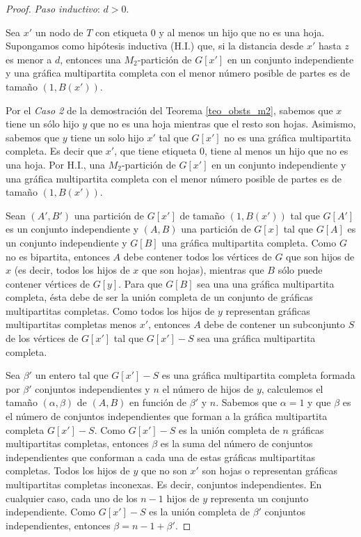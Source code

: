 \begin{proof}
\emph{Paso inductivo}: $d > 0$.

Sea $x'$ un nodo de $T$ con etiqueta 0 y al menos un hijo que no es una hoja. Supongamos como hipótesis inductiva (H.I.) que, si la distancia desde $x'$ hasta $z$ es menor a $d$, entonces una $M_2$-partición de $G[x']$ en un conjunto independiente y una gráfica multipartita completa con el menor número posible de partes es de tamaño $(1,B(x'))$.

Por el \emph{Caso 2} de la demostración del Teorema \ref{teo_obsts_m2}, sabemos que $x$ tiene un sólo hijo $y$ que no es una hoja mientras que el resto son hojas. Asimismo, sabemos que $y$ tiene un solo hijo $x'$ tal que $G[x']$ no es una gráfica multipartita completa. Es decir que $x'$, que tiene etiqueta 0, tiene al menos un hijo que no es una hoja. Por H.I., una $M_2$-partición de $G[x']$ en un conjunto independiente y una gráfica multipartita completa con el menor número posible de partes es de tamaño $(1,B(x'))$. 

Sean $(A',B')$ una partición de $G[x']$ de tamaño $(1,B(x'))$ tal que $G[A']$ es un conjunto independiente y $(A,B)$ una partición de $G[x]$ tal que $G[A]$ es un conjunto independiente y $G[B]$ una gráfica multipartita completa. Como $G$ no es bipartita, entonces $A$ debe contener todos los vértices de $G$ que son hijos de $x$ (es decir, todos los hijos de $x$ que son hojas), mientras que $B$ sólo puede contener vértices de $G[y]$. Para que $G[B]$ sea una una gráfica multipartita completa, ésta debe de ser la unión completa de un conjunto de gráficas multipartitas completas. Como todos los hijos de $y$ representan gráficas multipartitas completas menos $x'$, entonces $A$ debe de contener un subconjunto $S$ de los vértices de $G[x']$ tal que $G[x']-S$ sea una gráfica multipartita completa. 

Sea $\beta'$ un entero tal que $G[x']-S$ es una gráfica multipartita completa
formada por $\beta'$ conjuntos independientes y $n$ el número de hijos de $y$,
calculemos el tamaño $(\alpha,\beta)$ de $(A,B)$ en función de $\beta'$ y $n$.
Sabemos que $\alpha=1$ y que $\beta$ es el número de conjuntos independientes que
forman a la gráfica multipartita completa $G[x']-S$. Como $G[x']-S$ es la unión
completa de $n$ gráficas multipartitas completas, entonces $\beta$ es la suma del
número de conjuntos independientes que conforman a cada una de estas gráficas
multipartitas completas. Todos los hijos de $y$ que no son $x'$ son hojas o
representan gráficas multipartitas completas inconexas. Es decir, conjuntos independientes. En cualquier caso, cada uno de los $n-1$ hijos de $y$ representa un conjunto independiente. Como $G[x']-S$ es la unión completa de $\beta'$ conjuntos independientes, entonces $\beta = n-1+\beta'$.


\end{proof}
